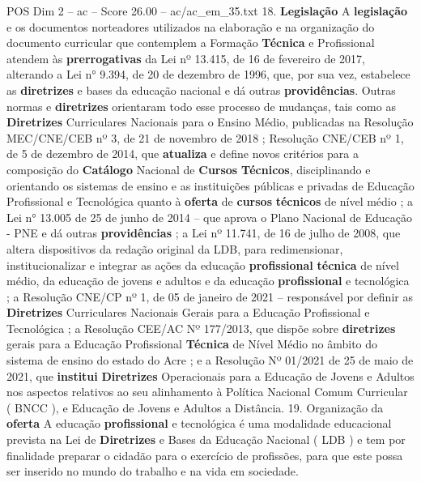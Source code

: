 \begin{textsample}{POS Dim 2 – ac – Score 26.00 – ac/ac\_em\_35.txt}  \label{ex:f2_pos_164}
18. \textbf{Legislação} A \textbf{legislação} e os documentos norteadores utilizados na elaboração e na organização do documento curricular que contemplem a Formação \textbf{Técnica} e Profissional atendem às \textbf{prerrogativas} da Lei nº 13.415, de 16 de fevereiro de 2017, alterando a Lei n{\EmojiFont °} 9.394, de 20 de dezembro de 1996, que, por sua vez, estabelece as \textbf{diretrizes} e bases da educação nacional e dá outras \textbf{providências}.
Outras normas e \textbf{diretrizes} orientaram todo esse processo de mudanças, tais como as \textbf{Diretrizes} Curriculares Nacionais para o Ensino Médio, publicadas na Resolução MEC/CNE/CEB nº 3, de 21 de novembro de 2018 ; Resolução CNE/CEB nº 1, de 5 de dezembro de 2014, que \textbf{atualiza} e define novos critérios para a composição do \textbf{Catálogo} Nacional de \textbf{Cursos} \textbf{Técnicos}, disciplinando e orientando os sistemas de ensino e as instituições públicas e privadas de Educação Profissional e Tecnológica quanto à \textbf{oferta} de \textbf{cursos} \textbf{técnicos} de nível médio ; a Lei n{\EmojiFont °} 13.005 de 25 de junho de 2014 – que aprova o Plano Nacional de Educação - PNE e dá outras \textbf{providências} ; a Lei nº 11.741, de 16 de julho de 2008, que altera dispositivos da redação original da LDB, para redimensionar, institucionalizar e integrar as ações da educação \textbf{profissional} \textbf{técnica} de nível médio, da educação de jovens e adultos e da educação \textbf{profissional} e tecnológica ; a Resolução CNE/CP nº 1, de 05 de janeiro de 2021 – responsável por definir as \textbf{Diretrizes} Curriculares Nacionais Gerais para a Educação Profissional e Tecnológica ; a Resolução CEE/AC Nº 177/2013, que dispõe sobre \textbf{diretrizes} gerais para a Educação Profissional \textbf{Técnica} de Nível Médio no âmbito do sistema de ensino do estado do Acre ; e a Resolução Nº 01/2021 de 25 de maio de 2021, que \textbf{institui} \textbf{Diretrizes} Operacionais para a Educação de Jovens e Adultos nos aspectos relativos ao seu alinhamento à Política Nacional Comum Curricular ( BNCC ), e Educação de Jovens e Adultos a Distância. 19.
Organização da \textbf{oferta} A educação \textbf{profissional} e tecnológica é uma modalidade educacional prevista na Lei de \textbf{Diretrizes} e Bases da Educação Nacional ( LDB ) e tem por finalidade preparar o cidadão para o exercício de profissões, para que este possa ser inserido no mundo do trabalho e na vida em sociedade.

\end{textsample}
